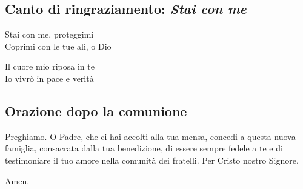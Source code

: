 \subsection*{Canto di ringraziamento: \textit{Stai con me}}

	\begin{mystrofe}
		Stai con me, proteggimi \\
		Coprimi con le tue ali, o Dio \\
	\end{mystrofe}

	\begin{mystrofe}
	\end{mystrofe}

	\begin{mystrofe}
	Il cuore mio riposa in te \\
	Io vivrò in pace e verità \\
	\end{mystrofe}

	\begin{mystrofe}
		\ritornello{}
	\end{mystrofe}

\subsection*{Orazione dopo la comunione}

\begin{dialoghi}
	\item[\sacerdote] Preghiamo. O Padre, che ci hai accolti alla tua mensa, concedi a questa nuova famiglia, consacrata dalla tua benedizione, di essere sempre fedele a te e di testimoniare il tuo amore nella comunità dei fratelli. Per Cristo nostro Signore.
	\item[\assemblea] Amen.
\end{dialoghi}
